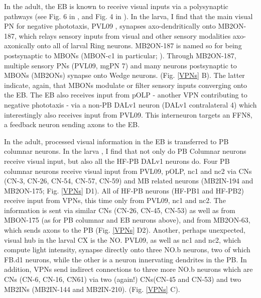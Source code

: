     In the adult, the EB is known to receive visual inputs via a polysynaptic pathways (see Fig. 6 in \citep{hulse2021connectome}, and Fig. 4 in \citep{omoto2018neuronal}). In the larva, I find that the main visual PN for negative phototaxis, PVL09  \citep{Humberg2018PVL09}, synapses axo-dendritically onto MB2ON-187, which relays sensory inputs from visual and other sensory modalities axo-axonically onto all of larval Ring neurons.  MB2ON-187 is named so for being postsynaptic to MBONs (MBON-c1 in particular; \citep{eschbach2021circuits}). Through MB2ON-187, multiple sensory PNs (PVL09, mgPN 7) and many neurons postsynaptic to MBONs (MB2ONs) synapse onto Wedge neurons. (Fig. \ref{VPNs} B).
    The latter indicate, again, that MBONs modulate or filter sensory inputs converging onto the EB. The EB also receives input from pOLP - another VPN contributing to negative phototaxis - via a non-PB DALv1 neuron (DALv1 contralateral 4) which interestingly also receives input from PVL09.  This interneuron targets an FFN8, a feedback neuron sending axons to the EB. 

    In the adult,  processed visual information in the EB is transferred to PB columnar neurons. In the larva , I find that not only do PB Columnar neurons receive visual input, but also all the HF-PB DALv1 neurons do.  Four PB columnar neurons receive visual input from PVL09,  pOLP, nc1 and nc2 via CNs (CN-3, CN-26, CN-54, CN-57, CN-59) and MB related neurons (MB2IN-194 and MB2ON-175; Fig. \ref{VPNs} D1).  
    All of HF-PB neurons (HF-PB1 and HF-PB2) receive input from VPNs, this time only from PVL09, nc1 and nc2. The information is sent via similar CNs (CN-26, CN-45, CN-53) as well as from MBON-175 (as for PB columnar and EB neurons above), and from MB2ON-63, which sends axons to the PB (Fig. \ref{VPNs} D2).  
    Another, perhaps unexpected, visual hub in the larval CX is the NO. PVL09, as well as nc1 and nc2, which compute light intensity, synapse directly onto three NO.b neurons, two of which FB.d1 neurons, while the other is a neuron innervating dendrites in the PB. In addition, VPNs send indirect connections to three more NO.b neurons which are CNs (CN-6, CN-16, CN61) via two (again!) CNs(CN-45 and CN-53) and two MB2INs (MB2IN-144 and MB2IN-210). (Fig. \ref{VPNs} C).

